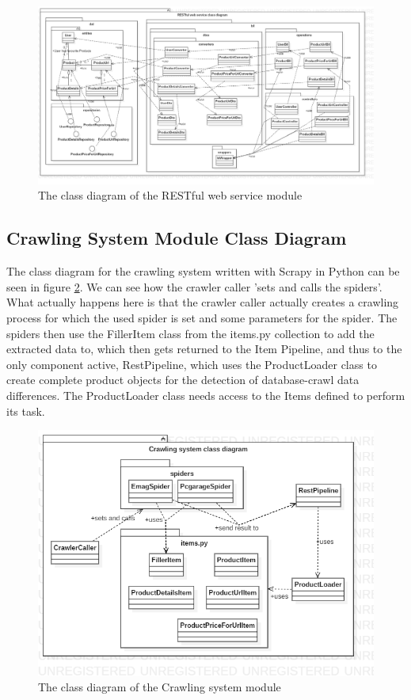 \documentclass[12pt,a4paper,twoside]{report}
\begin{document}
\begin{figure}[ht]
  \centering
  \includegraphics[width=\linewidth]{img/app_class_rest.png}
  \caption{The class diagram of the RESTful web service module}
  \label{fig:app_class_rest}
\end{figure}


\subsection{Crawling System Module Class Diagram}

The class diagram for the crawling system written with Scrapy in Python can be seen in figure \ref{fig:app_class_crawl}. We can see how the crawler caller 'sets and calls the spiders'. What actually happens here is that the crawler caller actually creates a crawling process for which the used spider is set and some parameters for the spider. The spiders then use the FillerItem class from the items.py collection to add the extracted data to, which then gets returned to the Item Pipeline, and thus to the only component active, RestPipeline, which uses the ProductLoader class to create complete product objects for the detection of database-crawl data differences. The ProductLoader class needs access to the Items defined to perform its task.

\begin{figure}[ht]
  \centering
  \includegraphics[width=0.6\linewidth]{img/app_class_crawl.png}
  \caption{The class diagram of the Crawling system module}
  \label{fig:app_class_crawl}
\end{figure}
\end{document}
